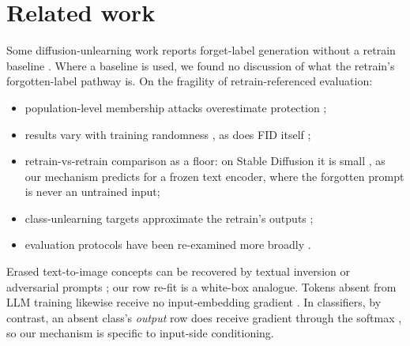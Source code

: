 \documentclass[10pt]{article}
\begin{document}
\section{Related work}\label{app:related}
Some diffusion-unlearning work reports forget-label generation without a retrain baseline \citep{heng2023,wu2024erasediff}. Where a baseline is used, we found no discussion of what the retrain's forgotten-label pathway is. On the fragility of retrain-referenced evaluation:
\begin{itemize}
\item population-level membership attacks overestimate protection \citep{hayes2024};
\item results vary with training randomness \citep{triantafillou2024,georgiev2025,lanyon2025}, as does FID itself \citep{dufour2026fid};
\item retrain-vs-retrain comparison as a floor: on Stable Diffusion it is small \citep{cho2025fade}, as our mechanism predicts for a frozen text encoder, where the forgotten prompt is never an untrained input;
\item class-unlearning targets approximate the retrain's outputs \citep{ebrahimpour2025};
\item evaluation protocols have been re-examined more broadly \citep{kim2026}.
\end{itemize}
Erased text-to-image concepts can be recovered by textual inversion or adversarial prompts \citep{pham2023,zhang2024attack}; our row re-fit is a white-box analogue. Tokens absent from LLM training likewise receive no input-embedding gradient \citep{land2024}. In classifiers, by contrast, an absent class's \emph{output} row does receive gradient through the softmax \citep{zheng2026head}, so our mechanism is specific to input-side conditioning.
\end{document}
